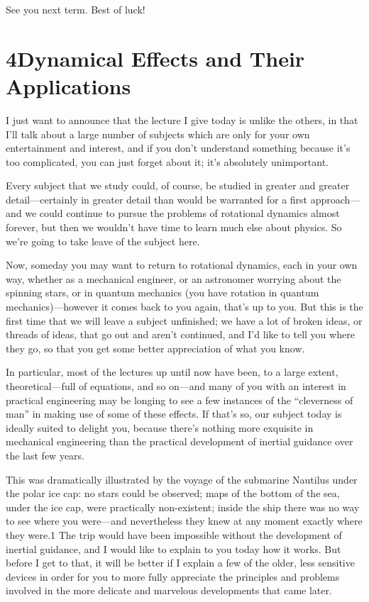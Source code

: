 \documentclass[11pt,oneside]{article}
\begin{document}
See you next term. Best of luck!\par

\clearpage

\section*{4Dynamical Effects and Their Applications}


I just want to announce that the lecture I give today is unlike the others, in that I'll talk about a large number of subjects which are only for your own entertainment and interest, and if you don't understand something because it's too complicated, you can just forget about it; it's absolutely unimportant.\par

Every subject that we study could, of course, be studied in greater and greater detail---certainly in greater detail than would be warranted for a first approach---and we could continue to pursue the problems of rotational dynamics almost forever, but then we wouldn't have time to learn much else about physics. So we're going to take leave of the subject here.\par

Now, someday you may want to return to rotational dynamics, each in your own way, whether as a mechanical engineer, or an astronomer worrying about the spinning stars, or in quantum mechanics (you have rotation in quantum mechanics)---however it comes back to you again, that's up to you. But this is the first time that we will leave a subject unfinished; we have a lot of broken ideas, or threads of ideas, that go out and aren't continued, and I'd like to tell you where they go, so that you get some better appreciation of what you know.\par

In particular, most of the lectures up until now have been, to a large extent, theoretical---full of equations, and so on---and many of you with an interest in practical engineering may be longing to see a few instances of the ``cleverness of man'' in making use of some of these effects. If that's so, our subject today is ideally suited to delight you, because there's nothing more exquisite in mechanical engineering than the practical development of inertial guidance over the last few years.\par

This was dramatically illustrated by the voyage of the submarine Nautilus under the polar ice cap: no stars could be observed; maps of the bottom of the sea, under the ice cap, were practically non-existent; inside the ship there was no way to see where you were---and nevertheless they knew at any moment exactly where they were.1 The trip would have been impossible without the development of inertial guidance, and I would like to explain to you today how it works. But before I get to that, it will be better if I explain a few of the older, less sensitive devices in order for you to more fully appreciate the principles and problems involved in the more delicate and marvelous developments that came later.\par
\end{document}
